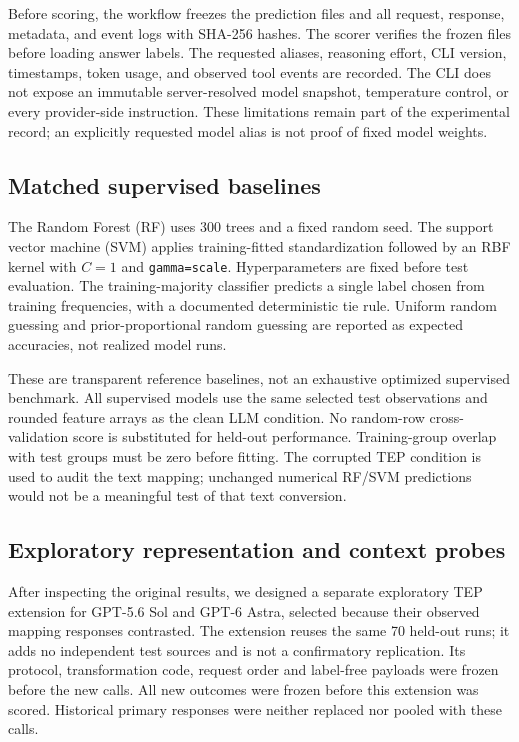 \documentclass[11pt,a4paper]{article}
\begin{document}
Before scoring, the workflow freezes the prediction files and all request, response, metadata, and event logs with SHA-256 hashes. The scorer verifies the frozen files before loading answer labels. The requested aliases, reasoning effort, CLI version, timestamps, token usage, and observed tool events are recorded. The CLI does not expose an immutable server-resolved model snapshot, temperature control, or every provider-side instruction. These limitations remain part of the experimental record; an explicitly requested model alias is not proof of fixed model weights.

\subsection{Matched supervised baselines}
The Random Forest (RF) uses 300 trees and a fixed random seed. The support vector machine (SVM) applies training-fitted standardization followed by an RBF kernel with $C=1$ and \texttt{gamma=scale}. Hyperparameters are fixed before test evaluation. The training-majority classifier predicts a single label chosen from training frequencies, with a documented deterministic tie rule. Uniform random guessing and prior-proportional random guessing are reported as expected accuracies, not realized model runs.

These are transparent reference baselines, not an exhaustive optimized supervised benchmark. All supervised models use the same selected test observations and rounded feature arrays as the clean LLM condition. No random-row cross-validation score is substituted for held-out performance. Training-group overlap with test groups must be zero before fitting. The corrupted TEP condition is used to audit the text mapping; unchanged numerical RF/SVM predictions would not be a meaningful test of that text conversion.

\subsection{Exploratory representation and context probes}
After inspecting the original results, we designed a separate exploratory TEP extension for GPT-5.6 Sol and GPT-6 Astra, selected because their observed mapping responses contrasted. The extension reuses the same 70 held-out runs; it adds no independent test sources and is not a confirmatory replication. Its protocol, transformation code, request order and label-free payloads were frozen before the new calls. All new outcomes were frozen before this extension was scored. Historical primary responses were neither replaced nor pooled with these calls.
\end{document}
